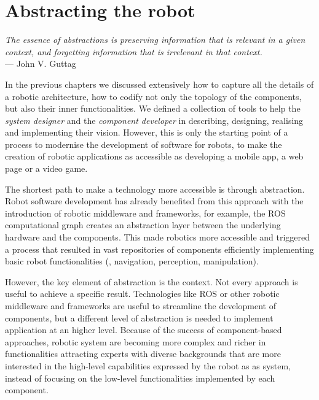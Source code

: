 \chapter[Abstracting the robot]{Abstracting the robot}\label{ch:capabilities}

\begin{flushright}{\slshape The essence of abstractions is preserving information that is relevant in a given context, and forgetting information that is irrelevant in that context.} \\ \medskip
    ---  John V. Guttag
\end{flushright}

In the previous chapters we discussed extensively how to capture all the details of a robotic architecture, how to codify not only the topology of the components, but also their inner functionalities. We defined a collection of tools to help the \textit{system designer} and the \textit{component developer} in describing, designing, realising and implementing their vision. However, this is only the starting point of a process to modernise the development of software for robots, to make the creation of robotic applications as accessible as developing a mobile app, a web page or a video game.

The shortest path to make a technology more accessible is through abstraction. Robot software development has already benefited from this approach with the introduction of robotic middleware and frameworks, for example, the ROS computational graph creates an abstraction layer between the underlying hardware and the components. This made robotics more accessible and triggered a process that resulted in vast repositories of components efficiently implementing basic robot functionalities (\eg, navigation, perception, manipulation). 

However, the key element of abstraction is the context. Not every approach is useful to achieve a specific result. Technologies like ROS or other robotic middleware and frameworks are useful to streamline the development of components, but a different level of abstraction is needed to implement application at an higher level. Because of the success of component-based approaches, robotic system are becoming more complex and richer in functionalities attracting experts with diverse backgrounds that are more interested in the high-level capabilities expressed by the robot as as system, instead of focusing on the low-level functionalities implemented by each component.

